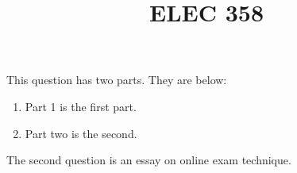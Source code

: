 \documentclass[anycalculator]{otago_exam}
\title{ELEC 358}
\begin{document}
\begin{exam}  

\begin{question}
This question has two parts. They are below:
\begin{enumerate}
\item Part 1 is the first part.
\item Part two is the second.
\end{enumerate}


\end{question}
\begin{question}


The second question is an essay on online exam technique.

\end{question}

\end{exam}
\end{document}
